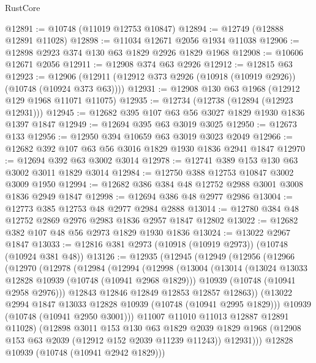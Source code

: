 \begin{lexlean}{RustCore}
\begin{coremodule}
@12891 := @10748 (@11019 @12753 @10847)
@12894 := @12749 (@12888 @12891 @11028)
@12898 := @11034 @12671 @2056 @1934 @11038
@12906 := @12898 @2923 @374 @130 @63 @1829 @2926 @1829 @1968
@12908 := @10606 @12671 @2056
@12911 := @12908 @374 @63 @2926
@12912 := @12815 @63
@12923 := @12906 (@12911 (@12912 @373 @2926 (@10918 (@10919 @2926)) (@10748 (@10924 @373 @63))))
@12931 := @12908 @130 @63 @1968 (@12912 @129 @1968 @11071 @11075)
@12935 := @12734 (@12738 (@12894 (@12923 @12931)))
@12945 := @12682 @395 @107 @63 @56 @3027 @1829 @1930 @1836 @1397 @1847
@12949 := @12694 @395 @63 @3019 @3025
@12950 := @12673 @133
@12956 := @12950 @394 @10659 @63 @3019 @3023 @2049
@12966 := @12682 @392 @107 @63 @56 @3016 @1829 @1930 @1836 @2941 @1847
@12970 := @12694 @392 @63 @3002 @3014
@12978 := @12741 @389 @153 @130 @63 @3002 @3011 @1829 @3014
@12984 := @12750 @388 @12753 @10847 @3002 @3009 @1950
@12994 := @12682 @386 @384 @48 @12752 @2988 @3001 @3008 @1836 @2949 @1847
@12998 := @12694 @386 @48 @2977 @2986
@13004 := @12773 @385 @12753 @48 @2977 @2984 @2888
@13014 := @12780 @384 @48 @12752 @2869 @2976 @2983 @1836 @2957 @1847 @12802
@13022 := @12682 @382 @107 @48 @56 @2973 @1829 @1930 @1836
@13024 := @13022 @2967 @1847
@13033 := @12816 @381 @2973 (@10918 (@10919 @2973)) (@10748 (@10924 @381 @48))
@13126 := @12935
    (@12945
      (@12949
        (@12956
          (@12966
            (@12970
              (@12978
                (@12984
                  (@12994
                    (@12998
                      (@13004
                        (@13014
                          (@13024 @13033 @12828 @10939 (@10748 (@10941 @2968 @1829)))
                          @10939
                          (@10748 (@10941 @2958 @2976)))
                        @12843
                        @12846
                        @12849
                        @12853
                        @12857
                        @12863))
                    (@13022 @2994 @1847 @13033 @12828 @10939 (@10748 (@10941 @2995 @1829)))
                    @10939
                    (@10748 (@10941 @2950 @3001)))
                  @11007
                  @11010
                  @11013
                  @12887
                  @12891
                  @11028)
                (@12898
                  @3011
                  @153
                  @130
                  @63
                  @1829
                  @2039
                  @1829
                  @1968
                  (@12908 @153 @63 @2039 (@12912 @152 @2039 @11239 @11243))
                  @12931)))
            @12828
            @10939
            (@10748 (@10941 @2942 @1829)))

\end{coremodule}
\end{lexlean}

